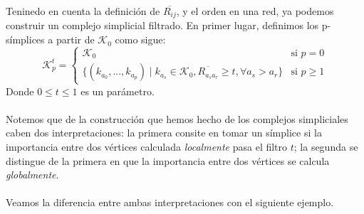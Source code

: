 \documentclass[12pt]{article}
\numberwithin{equation}{section}
\theoremstyle{definition}
\theoremstyle{remark}
\theoremstyle{plain}
\begin{document}
		Teninedo en cuenta la definición de $\overline{R_{ij}}$, y el orden en una red, ya podemos construir un complejo simplicial filtrado. 
		En primer lugar, definimos los p-símplices a partir de $\mathcal{K}_{0}$ como sigue:
		\begin{equation}
           		\mathcal{K}_{p}^{t}=
			\left \{
				\begin{array}{ll}
					\mathcal{K}_{0} & \text{si } p=0\\[3pt]
            				\{(k_{a_{0}},...,k_{a_{p}}) \mid k_{a_{s}} \in \mathcal{K}_{0}, \overline{R_{a_{s}a_{r}}} \geq t, 
					\forall a_{s} > a_{r} \} & \text{si } p \geq 1
				\end{array}
            		\right.  
			\label{def:sn}
        	\end{equation}
		Donde $0 \leq t \leq 1$ es un parámetro. \\
		\\
		Notemos que de la construcción que hemos hecho de los complejos simpliciales caben dos interpretaciones: la primera consite en tomar 
		un símplice si la importancia entre dos vértices calculada \emph{localmente} pasa el filtro $t$; la segunda se distingue 
		de la primera en que la importancia entre dos vértices se calcula \emph{globalmente}.\\
		\\
		Veamos la diferencia entre ambas interpretaciones con el siguiente ejemplo.
\end{document}
